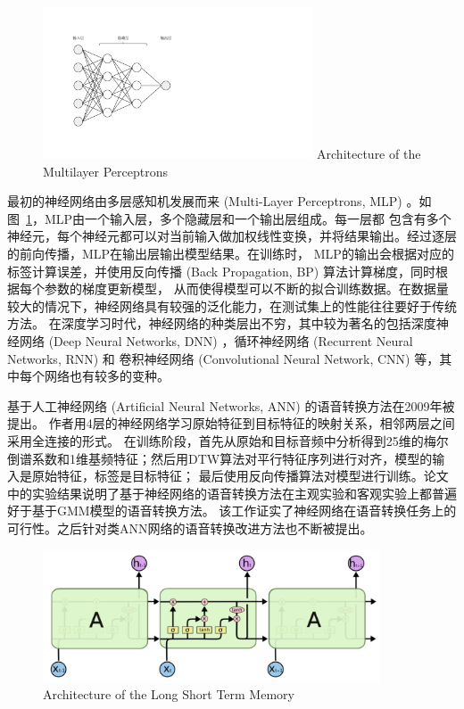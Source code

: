 \begin{figure}[!htp]
    \centering
    \includegraphics[width=8cm,trim=50 80 330 60,clip]{figure/2_mlp.pdf}
    {Architecture of the Multilayer Perceptrons}
    \label{fig:mlp}
\end{figure}

最初的神经网络由多层感知机发展而来 (Multi-Layer Perceptrons, MLP) 。如图~\ref{fig:mlp}，MLP由一个输入层，多个隐藏层和一个输出层组成。每一层都
包含有多个神经元，每个神经元都可以对当前输入做加权线性变换，并将结果输出。经过逐层的前向传播，MLP在输出层输出模型结果。在训练时，
MLP的输出会根据对应的标签计算误差，并使用反向传播 (Back Propagation, BP) 算法计算梯度，同时根据每个参数的梯度更新模型，
从而使得模型可以不断的拟合训练数据。在数据量较大的情况下，神经网络具有较强的泛化能力，在测试集上的性能往往要好于传统方法。
在深度学习时代，神经网络的种类层出不穷，其中较为著名的包括深度神经网络 (Deep Neural Networks, DNN) ，循环神经网络 (Recurrent Neural Networks, RNN) 和
卷积神经网络 (Convolutional Neural Network, CNN) 等，其中每个网络也有较多的变种。

基于人工神经网络 (Artificial Neural Networks, ANN) 的语音转换方法在2009年被提出\cite{desai2009voice}。
作者用4层的神经网络学习原始特征到目标特征的映射关系，相邻两层之间采用全连接的形式。
在训练阶段，首先从原始和目标音频中分析得到25维的梅尔倒谱系数和1维基频特征；然后用DTW算法对平行特征序列进行对齐，模型的输入是原始特征，标签是目标特征；
最后使用反向传播算法对模型进行训练。论文中的实验结果说明了基于神经网络的语音转换方法在主观实验和客观实验上都普遍好于基于GMM模型的语音转换方法。
该工作证实了神经网络在语音转换任务上的可行性。之后针对类ANN网络的语音转换改进方法也不断被提出。

\begin{figure}[!htp]
    \centering
    \includegraphics[width=10cm,trim=0 0 0 0,clip]{figure/lstm.png}
    {Architecture of the Long Short Term Memory}
    \label{fig:lstm}
\end{figure}

